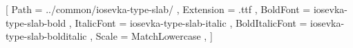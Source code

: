 \usepackage{amssymb,amsmath}
\usepackage{fontspec}
\usepackage{fourier}
\setmonofont{iosevka-type-slab-regular}[
  Path = ../common/iosevka-type-slab/ ,
  Extension = .ttf ,
  BoldFont = iosevka-type-slab-bold ,
  ItalicFont = iosevka-type-slab-italic ,
  BoldItalicFont = iosevka-type-slab-bolditalic ,
  Scale = MatchLowercase ,
]
